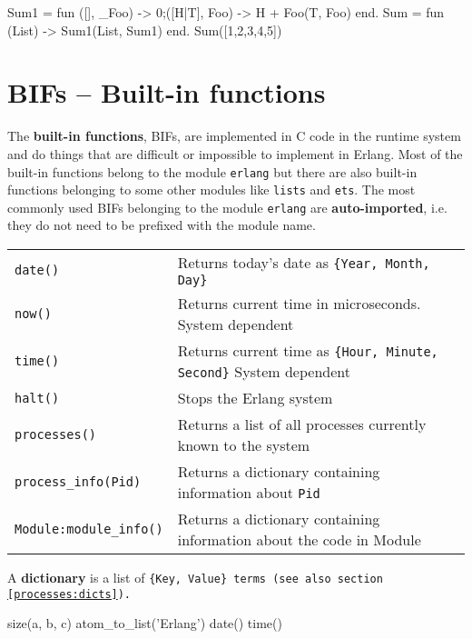 \begin{erlang}
Sum1 = fun ([], _Foo) -> 0;([H|T], Foo) -> H + Foo(T, Foo) end.
Sum = fun (List) -> Sum1(List, Sum1) end.
Sum([1,2,3,4,5])    %
\end{erlang}


\section{BIFs – Built-in functions}
\label{functions:bifs}
The\textbf{ built-in functions}, BIFs, are implemented in C code in
the runtime system and do things that are difficult or impossible to
implement in Erlang. Most of the built-in functions belong to the
module \texttt{erlang} but there are also built-in functions belonging
to some other modules like \texttt{lists} and \texttt{ets}. The most
commonly used BIFs belonging to the module \texttt{erlang} are
\textbf{auto-imported}, i.e. they do not need to be prefixed with the
module name.

\begin{center}
\begin{tabular}{|>{\raggedright}p{103pt}|>{\raggedright}p{217pt}|}
\hline
\multicolumn{2}{|p{321pt}|}{Some useful BIFs}\tabularnewline
\hline
\texttt{date()} & Returns today's date as \texttt{\{Year, Month, Day\}}\tabularnewline
\hline
\texttt{now()} & Returns current time in microseconds. System dependent\tabularnewline
\hline
\texttt{time()} & Returns current time as \texttt{\{Hour, Minute, Second\}} System dependent\tabularnewline
\hline
\texttt{halt()} & Stops the Erlang system\tabularnewline
\hline
\texttt{processes()} & Returns a list of all processes currently known to the system\tabularnewline
\hline
\texttt{process\_info(Pid)} & Returns a dictionary containing information about \texttt{Pid}\tabularnewline
\hline
\texttt{Module:module\_info()} & Returns a dictionary containing information about the code
in Module\tabularnewline
\hline
\end{tabular}
\end{center}

A \textbf{dictionary} is a list of \texttt{\{Key, Value\} terms (see
also section \ref{processes:dicts}).}

\begin{erlang}
size({a, b, c})             %
atom_to_list('Erlang')      %
date()                      %
time()                      %
\end{erlang}
